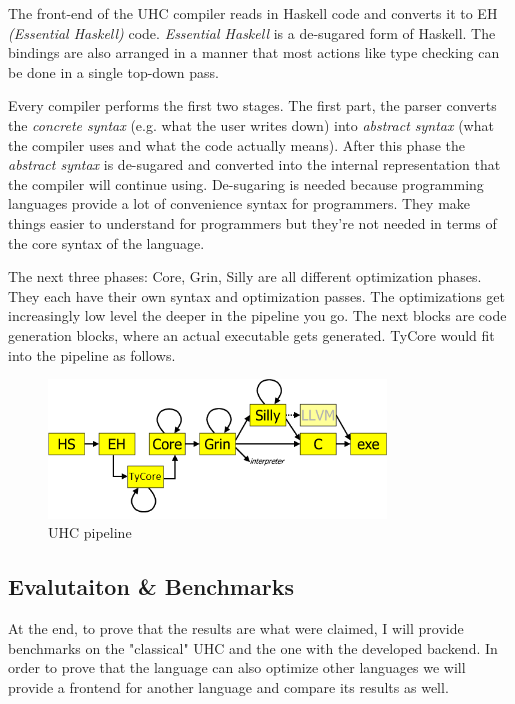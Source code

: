 \documentclass[11pt,twoside,a4paper]{article}
\begin{document}
The front-end of the UHC compiler reads in Haskell code and converts it to EH \emph{(Essential Haskell)} code. \emph{Essential Haskell} is a de-sugared form of Haskell. The bindings are also arranged in a manner that most actions like type checking can be done in a single top-down pass. 

Every compiler performs the first two stages. The first part, the parser converts the \emph{concrete syntax} (e.g. what the user writes down) into \emph{abstract syntax} (what the compiler uses and what the code actually means). After this phase the \emph{abstract syntax} is de-sugared and converted into the internal representation that the compiler will continue using. De-sugaring is needed because programming languages provide a lot of convenience syntax for programmers. They make things easier to understand for programmers but they're not needed in terms of the core syntax of the language.

The next three phases: Core, Grin, Silly are all different optimization phases. They each have their own syntax and optimization passes. The optimizations get increasingly low level the deeper in the pipeline you go. 
The next blocks are code generation blocks, where an actual executable gets generated. TyCore would fit into the pipeline as follows.

\begin{figure}[h!]
  \centering
    \includegraphics[width=0.8\textwidth]{UHC-TyCore}
  \caption{UHC pipeline}
\end{figure}

\subsection{Evalutaiton \& Benchmarks}
At the end, to prove that the results are what were claimed, I will provide benchmarks on the "classical" UHC and the one with the developed backend. In order to prove that the language can also optimize other languages we will provide a frontend for another language and compare its results as well.
\end{document}
